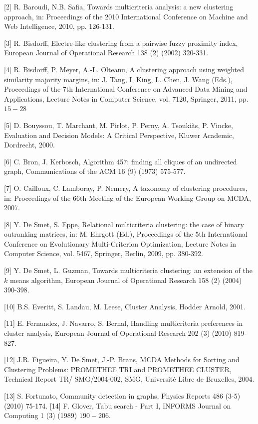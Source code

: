\documentclass[10pt]{article}
\begin{document}
[2] R. Baroudi, N.B. Safia, Towards multicriteria analysis: a new clustering approach, in: Proceedings of the 2010 International Conference on Machine and Web Intelligence, 2010, pp. 126-131.

[3] R. Bisdorff, Electre-like clustering from a pairwise fuzzy proximity index, European Journal of Operational Research 138 (2) (2002) 320-331.

[4] R. Bisdorff, P. Meyer, A.-L. Olteanu, A clustering approach using weighted similarity majority margins, in: J. Tang, I. King, L. Chen, J. Wang (Eds.), Proceedings of the 7th International Conference on Advanced Data Mining and Applications, Lecture Notes in Computer Science, vol. 7120, Springer, 2011, pp. $15-28$

[5] D. Bouyssou, T. Marchant, M. Pirlot, P. Perny, A. Tsoukiàs, P. Vincke, Evaluation and Decision Models: A Critical Perspective, Kluwer Academic, Dordrecht, 2000.

[6] C. Bron, J. Kerbosch, Algorithm 457: finding all cliques of an undirected graph, Communications of the ACM 16 (9) (1973) 575-577.

[7] O. Cailloux, C. Lamboray, P. Nemery, A taxonomy of clustering procedures, in: Proceedings of the 66th Meeting of the European Working Group on MCDA, 2007.

[8] Y. De Smet, S. Eppe, Relational multicriteria clustering: the case of binary outranking matrices, in: M. Ehrgott (Ed.), Proceedings of the 5th International Conference on Evolutionary Multi-Criterion Optimization, Lecture Notes in Computer Science, vol. 5467, Springer, Berlin, 2009, pp. 380-392.

[9] Y. De Smet, L. Guzman, Towards multicriteria clustering: an extension of the $k$ means algorithm, European Journal of Operational Research 158 (2) (2004) 390-398.

[10] B.S. Everitt, S. Landau, M. Leese, Cluster Analysis, Hodder Arnold, 2001.

[11] E. Fernandez, J. Navarro, S. Bernal, Handling multicriteria preferences in cluster analysis, European Journal of Operational Research 202 (3) (2010) 819-827.

[12] J.R. Figueira, Y. De Smet, J.-P. Brans, MCDA Methods for Sorting and Clustering Problems: PROMETHEE TRI and PROMETHEE CLUSTER, Technical Report TR/ SMG/2004-002, SMG, Université Libre de Bruxelles, 2004.

[13] S. Fortunato, Community detection in graphs, Physics Reports 486 (3-5) (2010) 75-174.
[14] F. Glover, Tabu search - Part I, INFORMS Journal on Computing 1 (3) (1989) $190-206$.
\end{document}
